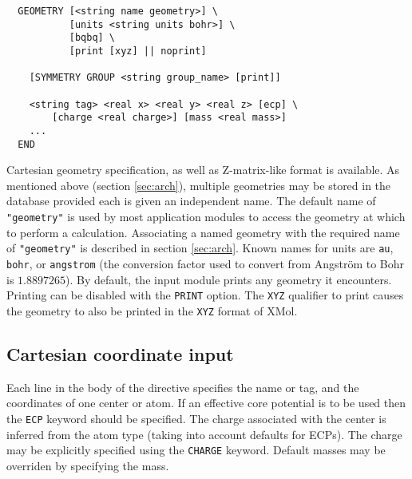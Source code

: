 \label{sec:geom}

\begin{verbatim}
  GEOMETRY [<string name geometry>] \
           [units <string units bohr>] \
           [bqbq] \
           [print [xyz] || noprint]
    
    [SYMMETRY GROUP <string group_name> [print]]

    <string tag> <real x> <real y> <real z> [ecp] \
        [charge <real charge>] [mass <real mass>]
    ...
  END
\end{verbatim}

Cartesian geometry specification, as well as Z-matrix-like format is
available.  As mentioned above (section
\ref{sec:arch}), multiple geometries may be stored in the database
provided each is given an independent name.  The default name of
\verb+"geometry"+ is used by most application modules to access the
geometry at which to perform a calculation.  Associating a named
geometry with the required name of \verb+"geometry"+ is described in
section \ref{sec:arch}.  Known names for units are \verb+au+,
\verb+bohr+, or \verb+angstrom+ (the conversion factor used to convert
from Angstr\"{o}m to Bohr is $1.8897265$). By default, the input
module prints any geometry it encounters.  Printing can be disabled
with the \verb+PRINT+ option.  The \verb+XYZ+ qualifier to print
causes the geometry to also be printed in the \verb+XYZ+ format of
XMol.  

\subsection{Cartesian coordinate input}

Each line in the body of the directive specifies the name or tag, and
the coordinates of one center or atom.  If an effective core potential
is to be used then the \verb+ECP+ keyword should be specified.  The
charge associated with the center is inferred from the atom type
(taking into account defaults for ECPs).  The charge may be explicitly
specified using the \verb+CHARGE+ keyword.  Default masses may be
overriden by specifying the mass.

